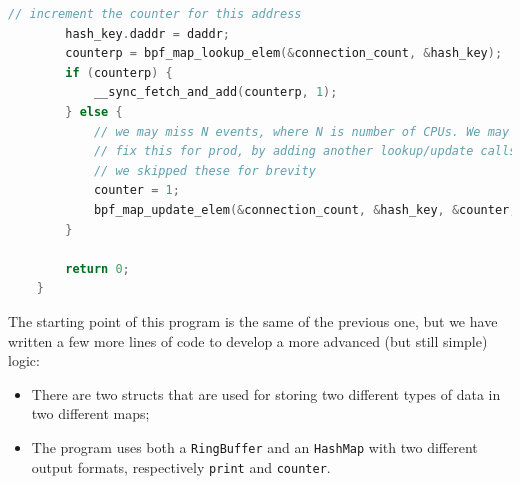 \begin{lstlisting}[style=cstyle, language=C, caption={Code of the modified program starting from the first one created using \colorbox{backcolour}{\lstinline[style=commandline, language=bash]|bee|}.}]
		// increment the counter for this address
		hash_key.daddr = daddr;
		counterp = bpf_map_lookup_elem(&connection_count, &hash_key);
		if (counterp) {
			__sync_fetch_and_add(counterp, 1);
		} else {
			// we may miss N events, where N is number of CPUs. We may want to 
			// fix this for prod, by adding another lookup/update calls here.
			// we skipped these for brevity
			counter = 1;
			bpf_map_update_elem(&connection_count, &hash_key, &counter, BPF_NOEXIST);
		}
		
		return 0;
	}
\end{lstlisting}

The starting point of this program is the same of the previous one, but we have written a few more lines of code to develop a more advanced (but still simple) logic:

\begin{itemize}
	\item 
		There are two structs that are used for storing two different types of data in two different maps;
	\item 
		The program uses both a \colorbox{backcolour}{\lstinline[style=commandline, language=bash, breaklines=true]|RingBuffer|} and an \colorbox{backcolour}{\lstinline[style=commandline, language=bash, breaklines=true]|HashMap|} with two different output formats, respectively \colorbox{backcolour}{\lstinline[style=commandline, language=bash, breaklines=true]|print|} and \colorbox{backcolour}{\lstinline[style=commandline, language=bash, breaklines=true]|counter|}.
\end{itemize}

